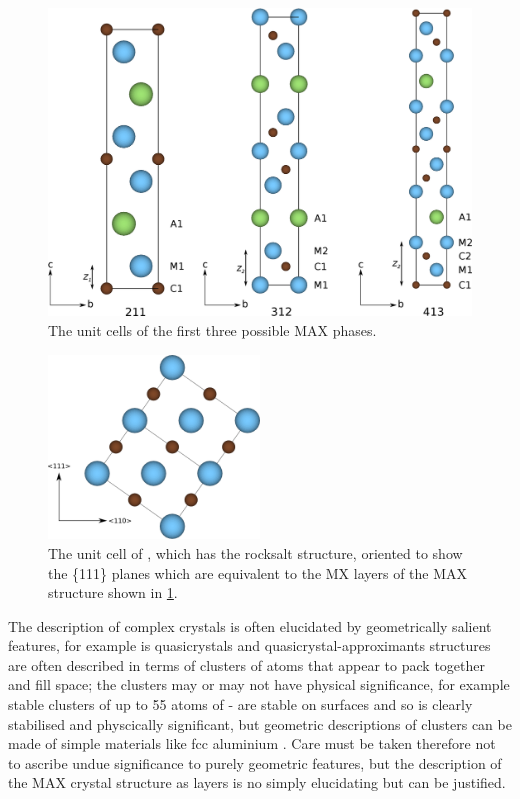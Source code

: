 \begin{figure}
\centering
\includegraphics[width=\textwidth]{MAX_unit_cells}
\caption{The unit cells of the first three possible MAX phases.\label{fig:MAX_unit_cells}}
\end{figure}




\begin{figure}
\centering
\includegraphics[width=0.5\textwidth]{TiC_111}
\caption{The unit cell of , which has the rocksalt structure, oriented to show the \{111\} planes which are equivalent to the MX layers of the MAX structure shown in \ref{fig:MAX_unit_cells}. \label{fig:TiC_111}}
\end{figure}


The description of complex crystals is often elucidated by geometrically salient features, for example is quasicrystals and quasicrystal-approximants structures are often described in terms of clusters of atoms that appear to pack together and fill space; the clusters may or may not have physical significance, for example stable clusters of up to 55 atoms of - are stable on surfaces and so is clearly stabilised and physcically significant, but geometric descriptions of clusters can be made of simple materials like fcc aluminium \cite{Steurer2006}. Care must be taken therefore not to ascribe undue significance to purely geometric features, but the description of the MAX crystal structure as layers is no simply elucidating but can be justified.

